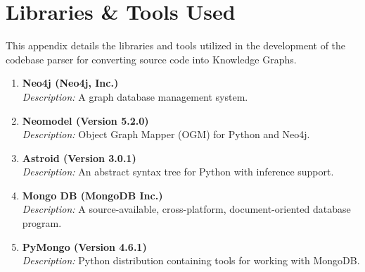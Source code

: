 \appendix
\section{Libraries \& Tools Used}
\label{sec:appendix-a}

This appendix details the libraries and tools utilized in the development of the codebase parser for converting source code into Knowledge Graphs.

\begin{enumerate}
    \item \textbf{Neo4j (Neo4j, Inc.)} \\
    \textit{Description:} A graph database management system.
    
    \item \textbf{Neomodel (Version 5.2.0)} \\
    \textit{Description:} Object Graph Mapper (OGM) for Python and Neo4j.
    
    \item \textbf{Astroid (Version 3.0.1)} \\
    \textit{Description:} An abstract syntax tree for Python with inference support.
    
    \item \textbf{Mongo DB (MongoDB Inc.)} \\
    \textit{Description:} A source-available, cross-platform, document-oriented database program.
    
    \item \textbf{PyMongo (Version 4.6.1)} \\
    \textit{Description:} Python distribution containing tools for working with MongoDB.
\end{enumerate}
